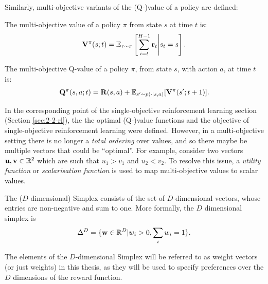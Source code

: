     Similarly, multi-objective variants of the (Q-)value of a policy are defined:    
    \begin{defn}
        \label{def:mo_value}
        \label{def:mo_q_value}
        The \textnormal{multi-objective value} of a policy $\pi$ from state $s$ at time $t$ is:
        \begin{align}
            \mathbf{V}^{\pi}(s;t) = \mathbb{E}_{\mathbf{\tau}\sim\pi}\left[\sum_{i=t}^{H-1} \mathbf{r}_t \Bigg| s_t=s \right]. \label{eq:mo_value_fn_def}
        \end{align} 

        The \textnormal{multi-objective Q-value} of a policy $\pi$, from state $s$, with action $a$, at time $t$ is:
        \begin{align}
            \mathbf{Q}^{\pi}(s,a;t) = \mathbf{R}(s,a) + \mathbb{E}_{s'\sim p(\cdot|s,a)} [\mathbf{V}^{\pi}(s';t+1)]. \label{eq:mo_q_value_fn_def}
        \end{align} 
    \end{defn}

    In the corresponding point of the single-objective reinforcement learning section (Section \ref{sec:2-2-rl}), the the optimal (Q-)value functions and the objective of single-objective reinforcement learning were defined. However, in a multi-objective setting there is no longer a \textit{total ordering} over values, and so there maybe be multiple vectors that could be ``optimal''. For example, consider two vectors $\mathbf{u},\mathbf{v}\in\mathbb{R}^2$ which are such that $u_1 > v_1$ and $u_2 < v_2$. To resolve this issue, a \textit{utility function} or \textit{scalarisation function} is used to map multi-objective values to scalar values.

    \begin{defn}
        \label{def:simplex}
        \label{def:weight}
        \label{def:context}
        The \textnormal{($D$-dimensional) Simplex} consists of the set of $D$-dimensional vectors, whose entries are non-negative and sum to one. More formally, the $D$ dimensional simplex is 
        \begin{align}
            \Delta^D = \{\mathbf{w}\in\mathbb{R}^D|w_i > 0, \sum_i w_i = 1\}. \label{eq:simplex_def}
        \end{align}

        The elements of the $D$-dimensional Simplex will be referred to as \textnormal{weight vectors} (or just \textnormal{weights}) in this thesis, as they will be used to specify preferences over the $D$ dimensions of the reward function.
    \end{defn}

